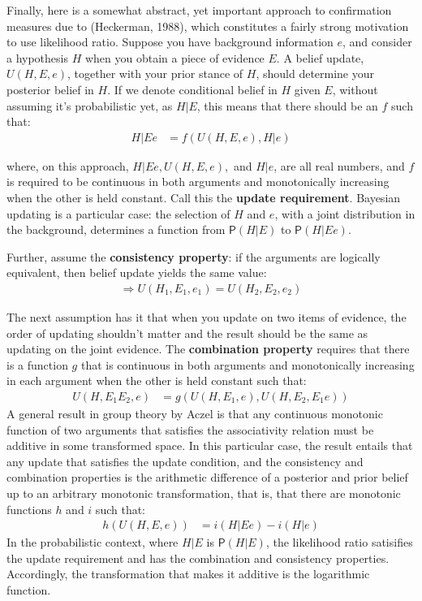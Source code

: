 \documentclass[
  10pt,
  dvipsnames,enabledeprecatedfontcommands]{scrartcl}
\newcommand{\pr}[1]{\mathsf{P}(#1)}
\begin{document}
Finally, here is a somewhat abstract, yet important approach to
confirmation measures due to (Heckerman, 1988), which constitutes a
fairly strong motivation to use likelihood ratio. Suppose you have
background information \(e\), and consider a hypothesis \(H\) when you
obtain a piece of evidence \(E\). A belief update, \(U(H, E, e)\),
together with your prior stance of \(H\), should determine your
posterior belief in \(H\). If we denote conditional belief in \(H\)
given \(E\), without assuming it's probabilistic yet, as \(H\vert E\),
this means that there should be an \(f\) such that: \begin{align*}
H \vert Ee & = f(U(H,E,e), H \vert e)
\end{align*}

\noindent where, on this approach, \(H \vert Ee, U(H,E,e),\) and
\(H \vert e\), are all real numbers, and \(f\) is required to be
continuous in both arguments and monotonically increasing when the other
is held constant. Call this the \textbf{update requirement}. Bayesian
updating is a particular case: the selection of \(H\) and \(e\), with a
joint distribution in the background, determines a function from
\(\pr{H \vert E}\) to \(\pr{H \vert Ee}\).

Further, assume the \textbf{consistency property}: if the arguments are
logically equivalent, then belief update yields the same value:
\begin{align*}
[H_1 \Leftrightarrow H_2, E_1 \Leftrightarrow E_2] \Rightarrow U(H_1, E_1, e_1) = U(H_2, E_2, e_2)
\end{align*}

The next assumption has it that when you update on two items of
evidence, the order of updating shouldn't matter and the result should
be the same as updating on the joint evidence. The
\textbf{combination property} requires that there is a function \(g\)
that is continuous in both arguments and monotonically increasing in
each argument when the other is held constant such that: \begin{align*}
U(H, E_1E_2,e) & =  g(U(H,E_1, e), U(H, E_2, E_1e))
\end{align*} A general result in group theory by Aczel is that any
continuous monotonic function of two arguments that satisfies the
associativity relation must be additive in some transformed space. In
this particular case, the result entails that any update that satisfies
the update condition, and the consistency and combination properties is
the arithmetic difference of a posterior and prior belief up to an
arbitrary monotonic transformation, that is, that there are monotonic
functions \(h\) and \(i\) such that: \begin{align*}
h(U(H,E,e)) & = i(H\vert Ee) - i(H\vert e)
\end{align*} In the probabilistic context, where \(H\vert E\) is
\(\pr{H\vert E}\), the likelihood ratio satisifies the update
requirement and has the combination and consistency properties.
Accordingly, the transformation that makes it additive is the
logarithmic function.
\end{document}
